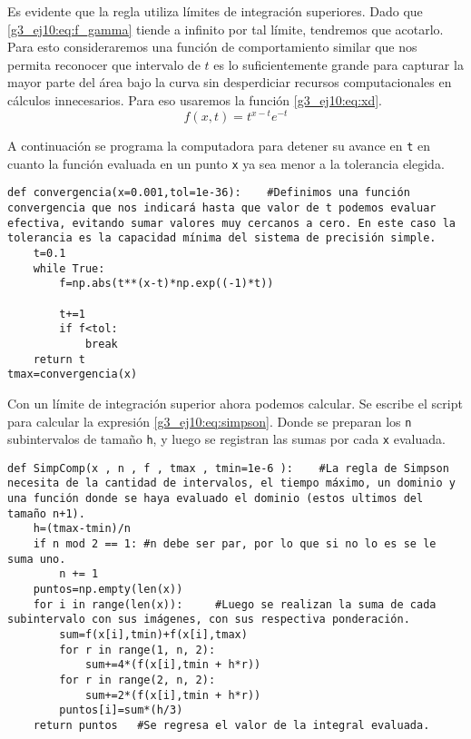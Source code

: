 \documentclass[../portafolio.tex]{subfiles}
\begin{document}
Es evidente que la regla utiliza límites de integración superiores. Dado que \eqref{g3_ej10:eq:f_gamma} tiende a infinito por tal límite, tendremos que acotarlo. Para esto consideraremos una función de comportamiento similar que nos permita reconocer que intervalo de $t$ es lo suficientemente grande para capturar la mayor parte del área bajo la curva sin desperdiciar recursos computacionales en cálculos innecesarios. Para eso usaremos la función \eqref{g3_ej10:eq:xd}.
\begin{equation}\label{g3_ej10:eq:xd}
f(x,t)=t^{x-t}e^{-t}
\end{equation}

A continuación se programa la computadora para detener su avance en \texttt{t} en cuanto la función evaluada en un punto \texttt{x} ya sea menor a la tolerancia elegida.

\begin{verbatim}
def convergencia(x=0.001,tol=1e-36):	#Definimos una función convergencia que nos indicará hasta que valor de t podemos evaluar efectiva, evitando sumar valores muy cercanos a cero. En este caso la tolerancia es la capacidad mínima del sistema de precisión simple.
    t=0.1
    while True:    
        f=np.abs(t**(x-t)*np.exp((-1)*t))
    
        t+=1
        if f<tol:
            break
    return t
tmax=convergencia(x)
\end{verbatim}

Con un límite de integración superior ahora podemos calcular. Se escribe el script para calcular la expresión \eqref{g3_ej10:eq:simpson}. Donde se preparan los \texttt{n} subintervalos de tamaño \texttt{h}, y luego se registran las sumas por cada \texttt{x} evaluada.

\begin{verbatim}
def SimpComp(x , n , f , tmax , tmin=1e-6 ):    #La regla de Simpson necesita de la cantidad de intervalos, el tiempo máximo, un dominio y una función donde se haya evaluado el dominio (estos ultimos del tamaño n+1).
    h=(tmax-tmin)/n
    if n mod 2 == 1: #n debe ser par, por lo que si no lo es se le suma uno.
        n += 1
    puntos=np.empty(len(x))
    for i in range(len(x)):		#Luego se realizan la suma de cada subintervalo con sus imágenes, con sus respectiva ponderación.
        sum=f(x[i],tmin)+f(x[i],tmax)
        for r in range(1, n, 2):
            sum+=4*(f(x[i],tmin + h*r))
        for r in range(2, n, 2):
            sum+=2*(f(x[i],tmin + h*r))
        puntos[i]=sum*(h/3)
    return puntos	#Se regresa el valor de la integral evaluada.
\end{verbatim}
\end{document}
